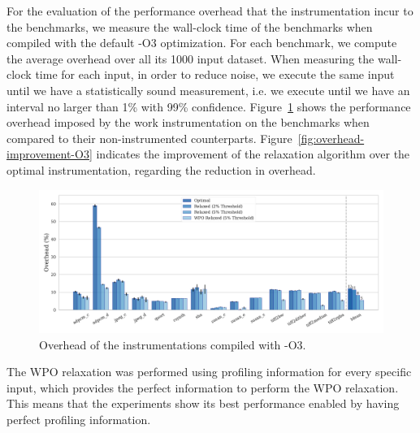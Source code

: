 For the evaluation of the performance overhead that the instrumentation incur to the benchmarks, we measure the wall-clock time of the benchmarks when compiled with the default {\flagstype -O3} optimization.
For each benchmark, we compute the average overhead over all its 1000 input dataset.
When measuring the wall-clock time for each input, in order to reduce noise, we execute the same input until we have a statistically sound measurement, i.e. we execute until we have an interval no larger than 1\% with 99\% confidence.
Figure~\ref{fig:overhead-O3} shows the performance overhead imposed by the work instrumentation on the benchmarks when compared to their non-instrumented counterparts.
Figure~\ref{fig:overhead-improvement-O3} indicates the improvement of the relaxation algorithm over the optimal instrumentation, regarding the reduction in overhead.

\begin{figure}[ht]
    \centering
    \includegraphics[width=\textwidth]{figs/overhead-O3.pdf}
    \caption{Overhead of the instrumentations compiled with {\flagstype -O3}.}
    \label{fig:overhead-O3}
\end{figure}

The WPO relaxation was performed using profiling information for every specific input, which provides the perfect information to perform the WPO relaxation.
This means that the experiments show its best performance enabled by having perfect profiling information.


